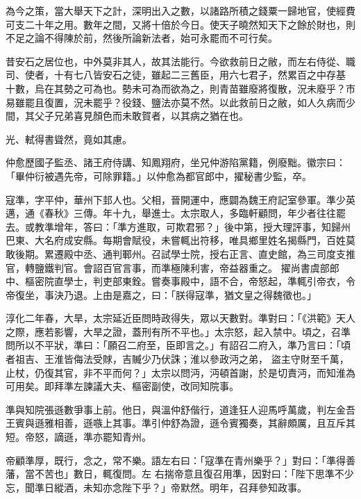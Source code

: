 \begin{pinyinscope}
 為今之策，當大舉天下之計，深明出入之數，以諸路所積之錢粟一歸地官，使經費可支二十年之用。數年之間，又將十倍於今日。使天子曉然知天下之餘於財也，則不足之論不得陳於前，然後所論新法者，始可永罷而不可行矣。



 昔安石之居位也，中外莫非其人，故其法能行。今欲救前日之敝，而左右侍從、職司、使者，十有七八皆安石之徒，雖起二三舊臣，用六七君子，然累百之中存基
 十數，烏在其勢之可為也。勢未可為而欲為之，則青苗雖廢將復散，況未廢乎？市易雖罷且復置，況未罷乎？役錢、鹽法亦莫不然。以此救前日之敝，如人久病而少間，其父子兄弟喜見顏色而未敢賀者，以其病之猶在也。



 光、軾得書聳然，竟如其慮。



 仲愈歷國子監丞、諸王府侍講、知鳳翔府，坐兄仲游陷黨籍，例廢黜。徽宗曰：「畢仲衍被遇先帝，可除罪籍。」以仲愈為都官郎中，擢秘書少監，卒。



 寇準，字平仲，華州下邽人也。父相，晉開運中，應闢為魏王府記室參軍。準少英邁，通《春秋》三傳。年十九，舉進士。太宗取人，多臨軒顧問，年少者往往罷去。或教準增年，答曰：「準方進取，可欺君邪？」後中第，授大理評事，知歸州巴東、大名府成安縣。每期會賦役，未嘗輒出符移，唯具鄉里姓名揭縣門，百姓莫敢後期。累遷殿中丞、通判鄆州。召試學士院，授右正言、直史館，為三司度支推官，轉鹽鐵判官。會詔百官言事，而準極陳利害，帝益器重之。
 擢尚書虞部郎中、樞密院直學士，判吏部東銓。嘗奏事殿中，語不合，帝怒起，準輒引帝衣，令帝復坐，事決乃退。上由是嘉之，曰：「朕得寇準，猶文皇之得魏徵也。」



 淳化二年春，大旱，太宗延近臣問時政得失，眾以天數對。準對曰：「《洪範》天人之際，應若影響，大旱之證，蓋刑有所不平也。」太宗怒，起入禁中。頃之，召準問所以不平狀，準曰：「願召二府至，臣即言之。」有詔召二府入，準乃言曰：「頃者祖吉、王淮皆侮法受賕，吉贓少乃伏誅；淮以參政沔之弟，
 盜主守財至千萬，止杖，仍復其官，非不平而何？」太宗以問沔，沔頓首謝，於是切責沔，而知淮為可用矣。即拜準左諫議大夫、樞密副使，改同知院事。



 準與知院張遜數爭事上前。他日，與溫仲舒偕行，道逢狂人迎馬呼萬歲，判左金吾王賓與遜雅相善，遜嗾上其事。準引仲舒為證，遜令賓獨奏，其辭頗厲，且互斥其短。帝怒，謫遜，準亦罷知青州。



 帝顧準厚，既行，念之，常不樂。語左右曰：「寇準在青州樂乎？」對曰：「準得善藩，當不苦也」數日，輒復問。左
 右揣帝意且復召用準，因對曰：「陛下思準不少忘，聞準日縱酒，未知亦念陛下乎？」帝默然。明年，召拜參知政事。




\end{pinyinscope}
